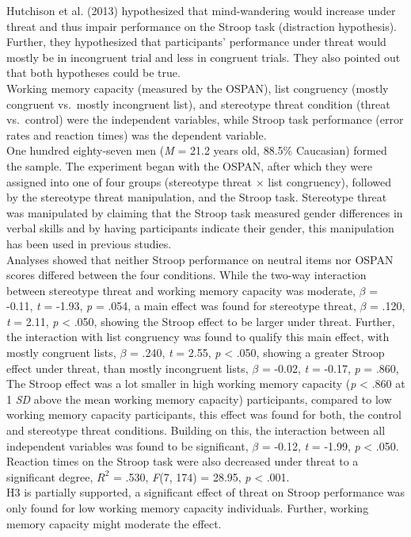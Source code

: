 \documentclass[
  stu,floatsintext]{apa7}
\begin{document}
Hutchison et al. (2013) hypothesized that mind-wandering would increase under threat and thus impair performance on the Stroop task (distraction hypothesis).
Further, they hypothesized that participants' performance under threat would mostly be in incongruent trial and less in congruent trials.
They also pointed out that both hypotheses could be true.\\
Working memory capacity (measured by the OSPAN), list congruency (mostly congruent vs.~mostly incongruent list), and stereotype threat condition (threat vs.~control) were the independent variables, while Stroop task performance (error rates and reaction times) was the dependent variable.\\
One hundred eighty-seven men (\emph{M} = 21.2 years old, 88.5\% Caucasian) formed the sample.
The experiment began with the OSPAN, after which they were assigned into one of four groups (stereotype threat \(\times\) list congruency), followed by the stereotype threat manipulation, and the Stroop task.
Stereotype threat was manipulated by claiming that the Stroop task measured gender differences in verbal skills and by having participants indicate their gender, this manipulation has been used in previous studies.\\
Analyses showed that neither Stroop performance on neutral items nor OSPAN scores differed between the four conditions.
While the two-way interaction between stereotype threat and working memory capacity was moderate, \(\beta\) = -0.11, \emph{t} = -1.93, \emph{p} = .054, a main effect was found for stereotype threat, \(\beta\) = .120, \emph{t} = 2.11, \emph{p} \textless{} .050, showing the Stroop effect to be larger under threat.
Further, the interaction with list congruency was found to qualify this main effect, with mostly congruent lists, \(\beta\) = .240, \emph{t} = 2.55, \emph{p} \textless{} .050, showing a greater Stroop effect under threat, than mostly incongruent lists, \(\beta\) = -0.02, \emph{t} = -0.17, \emph{p} = .860,
The Stroop effect was a lot smaller in high working memory capacity (\emph{p} \textless{} .860 at 1 \emph{SD} above the mean working memory capacity) participants, compared to low working memory capacity participants, this effect was found for both, the control and stereotype threat conditions.
Building on this, the interaction between all independent variables was found to be significant, \(\beta\) = -0.12, \emph{t} = -1.99, \emph{p} \textless{} .050.
Reaction times on the Stroop task were also decreased under threat to a significant degree, \(R^2\) = .530, \emph{F}(7, 174) = 28.95, \emph{p} \textless{} .001.\\
H3 is partially supported, a significant effect of threat on Stroop performance was only found for low working memory capacity individuals.
Further, working memory capacity might moderate the effect.
\end{document}
